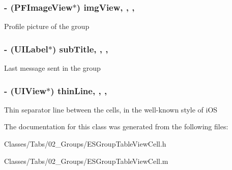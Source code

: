 \subsubsection[{img\+View}]{\setlength{\rightskip}{0pt plus 5cm}-\/ (P\+F\+Image\+View$\ast$) img\+View\hspace{0.3cm}{\ttfamily [read]}, {\ttfamily [write]}, {\ttfamily [nonatomic]}, {\ttfamily [strong]}}\label{interface_e_s_group_table_view_cell_aced51e22fb1f7b313947cd4c3ae1c799}
Profile picture of the group \hypertarget{interface_e_s_group_table_view_cell_a7fe06c706fd1e64326f7b4490d116136}{}
\subsubsection[{sub\+Title}]{\setlength{\rightskip}{0pt plus 5cm}-\/ (U\+I\+Label$\ast$) sub\+Title\hspace{0.3cm}{\ttfamily [read]}, {\ttfamily [write]}, {\ttfamily [nonatomic]}, {\ttfamily [strong]}}\label{interface_e_s_group_table_view_cell_a7fe06c706fd1e64326f7b4490d116136}
Last message sent in the group \hypertarget{interface_e_s_group_table_view_cell_a06490ea329f6226914035b1acb2d039e}{}
\subsubsection[{thin\+Line}]{\setlength{\rightskip}{0pt plus 5cm}-\/ (U\+I\+View$\ast$) thin\+Line\hspace{0.3cm}{\ttfamily [read]}, {\ttfamily [write]}, {\ttfamily [nonatomic]}, {\ttfamily [strong]}}\label{interface_e_s_group_table_view_cell_a06490ea329f6226914035b1acb2d039e}
Thin separator line between the cells, in the well-\/known style of i\+O\+S 

The documentation for this class was generated from the following files\+:\begin{DoxyCompactItemize}
\item 
Classes/\+Tabs/02\+\_\+\+Groups/E\+S\+Group\+Table\+View\+Cell.\+h\item 
Classes/\+Tabs/02\+\_\+\+Groups/E\+S\+Group\+Table\+View\+Cell.\+m\end{DoxyCompactItemize}
